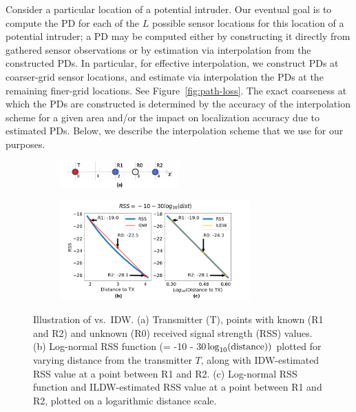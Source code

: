  Consider a particular
location \lstar of a potential intruder. Our eventual goal is to
compute the PD for each of the $L$ possible sensor locations for this
location \lstar of a potential intruder; a PD may be computed either
by constructing it directly from gathered sensor observations or by
estimation via interpolation from the constructed PDs. In particular,
for effective interpolation, we construct PDs at coarser-grid sensor
locations, and estimate via interpolation the PDs at the remaining
finer-grid locations. See Figure~\ref{fig:path-loss}. The exact
coarseness at which the PDs are constructed is determined by the
accuracy of the interpolation scheme for a given area and/or the
impact on localization accuracy due to estimated PDs. Below, we
describe the interpolation scheme that we use for our purposes.


\begin{figure}
  \begin{subfigure}[t]{0.9\textwidth}
    \centering
    \includegraphics[width=0.5\textwidth]{chapters/ipsn/figures/interpolate.png}
  \end{subfigure}
  \qquad
  \newline
  \begin{subfigure}[t]{\textwidth}
    \centering
    \includegraphics[width=0.8\textwidth]{chapters/ipsn/figures/ildw.png}
  \end{subfigure}
  \caption{Illustration of \ildw vs.\ IDW.
  (a) Transmitter (T), points with known (R1 and R2) and unknown (R0) received signal strength (RSS) values.
  (b) Log-normal RSS function (= -10 - 30$\log_{10}({\rm distance}))$
  plotted for varying distance from the transmitter $T$, along
  with IDW-estimated RSS value at a point between R1 and R2.
  (c) Log-normal RSS function and ILDW-estimated RSS value at
  a point between R1 and R2, plotted on a logarithmic distance
  scale.}
  \label{fig:ildw}
\end{figure}

